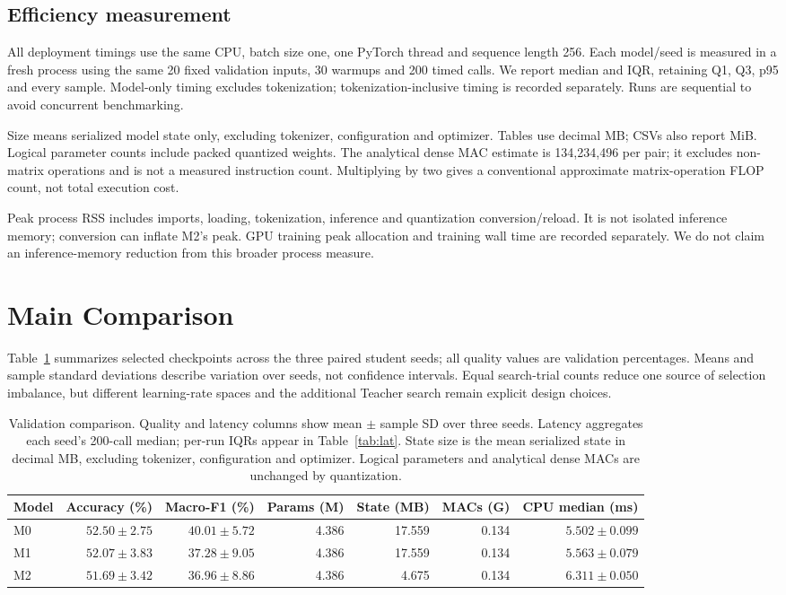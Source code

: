 \documentclass[11pt]{article}
\begin{document}
\subsection{Efficiency measurement}
All deployment timings use the same CPU, batch size one, one PyTorch thread and sequence length 256. Each model/seed is measured in a fresh process using the same 20 fixed validation inputs, 30 warmups and 200 timed calls. We report median and IQR, retaining Q1, Q3, p95 and every sample. Model-only timing excludes tokenization; tokenization-inclusive timing is recorded separately. Runs are sequential to avoid concurrent benchmarking.

Size means serialized model state only, excluding tokenizer, configuration and optimizer. Tables use decimal MB; CSVs also report MiB. Logical parameter counts include packed quantized weights. The analytical dense MAC estimate is 134,234,496 per pair; it excludes non-matrix operations and is not a measured instruction count. Multiplying by two gives a conventional approximate matrix-operation FLOP count, not total execution cost.

Peak process RSS includes imports, loading, tokenization, inference and quantization conversion/reload. It is not isolated inference memory; conversion can inflate M2's peak. GPU training peak allocation and training wall time are recorded separately. We do not claim an inference-memory reduction from this broader process measure.

\section{Main Comparison}
Table~\ref{tab:main} summarizes selected checkpoints across the three paired student seeds; all quality values are validation percentages. Means and sample standard deviations describe variation over seeds, not confidence intervals. Equal search-trial counts reduce one source of selection imbalance, but different learning-rate spaces and the additional Teacher search remain explicit design choices.

\begin{table}[t]\centering\small
\begin{tabular}{lrrrrrr}\toprule
Model & Accuracy (\%) & Macro-F1 (\%) & Params (M) & State (MB) & MACs (G) & CPU median (ms)\\\midrule
M0 & $52.50\pm2.75$ & $40.01\pm5.72$ & 4.386 & 17.559 & 0.134 & $5.502\pm0.099$\\
M1 & $52.07\pm3.83$ & $37.28\pm9.05$ & 4.386 & 17.559 & 0.134 & $5.563\pm0.079$\\
M2 & $51.69\pm3.42$ & $36.96\pm8.86$ & 4.386 & 4.675 & 0.134 & $6.311\pm0.050$\\\bottomrule
\end{tabular}
\caption{Validation comparison. Quality and latency columns show mean $\pm$ sample SD over three seeds. Latency aggregates each seed's 200-call median; per-run IQRs appear in Table~\ref{tab:lat}. State size is the mean serialized state in decimal MB, excluding tokenizer, configuration and optimizer. Logical parameters and analytical dense MACs are unchanged by quantization.}\label{tab:main}
\end{table}
\end{document}
